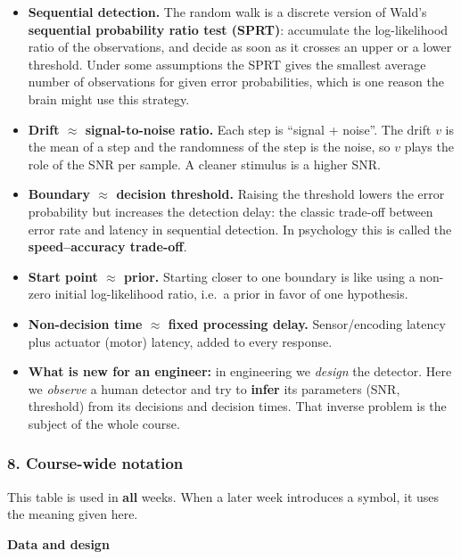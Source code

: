 \begin{itemize}
\tightlist
\item
  \textbf{Sequential detection.} The random walk is a discrete version
  of Wald's \textbf{sequential probability ratio test (SPRT)}:
  accumulate the log-likelihood ratio of the observations, and decide as
  soon as it crosses an upper or a lower threshold. Under some
  assumptions the SPRT gives the smallest average number of observations
  for given error probabilities, which is one reason the brain might use
  this strategy.
\item
  \textbf{Drift \ensuremath{\approx} signal-to-noise ratio.} Each step is ``signal +
  noise''. The drift \(v\) is the mean of a step and the randomness of
  the step is the noise, so \(v\) plays the role of the SNR per sample.
  A cleaner stimulus is a higher SNR.
\item
  \textbf{Boundary \ensuremath{\approx} decision threshold.} Raising the threshold lowers
  the error probability but increases the detection delay: the classic
  trade-off between error rate and latency in sequential detection. In
  psychology this is called the \textbf{speed--accuracy trade-off}.
\item
  \textbf{Start point \ensuremath{\approx} prior.} Starting closer to one boundary is like
  using a non-zero initial log-likelihood ratio, i.e.~a prior in favor
  of one hypothesis.
\item
  \textbf{Non-decision time \ensuremath{\approx} fixed processing delay.} Sensor/encoding
  latency plus actuator (motor) latency, added to every response.
\item
  \textbf{What is new for an engineer:} in engineering we \emph{design}
  the detector. Here we \emph{observe} a human detector and try to
  \textbf{infer} its parameters (SNR, threshold) from its decisions and
  decision times. That inverse problem is the subject of the whole
  course.
\end{itemize}

\subsubsection{8. Course-wide notation}

This table is used in \textbf{all} weeks. When a later week introduces a
symbol, it uses the meaning given here.

\textbf{Data and design}

